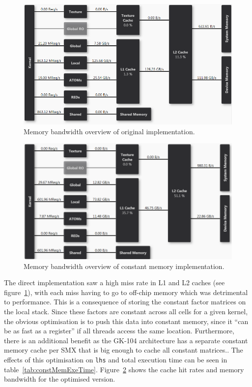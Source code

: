\documentclass[11pt, oneside, a4paper]{article}
\begin{document}
\begin{figure}[tb]
	\begin{center}
		\includegraphics[width=\textwidth]{"Original nonconst LHS memory overview BW"}
	\end{center}
	\caption{Memory bandwidth overview of original implementation.}
	\label{fig:membBWorig}
\end{figure}

\begin{figure}[tb]
	\begin{center}
		\includegraphics[width=\textwidth]{"LHS memory overview BW"}
	\end{center}
	\caption{Memory bandwidth overview of constant memory implementation.}
	\label{fig:membBWfinal}
\end{figure}

The direct implementation saw a high miss rate in L1 and L2 caches (see figure~\ref{fig:membBWorig}), with each miss having to go to off-chip memory which was detrimental to performance. This is a consequence of storing the constant factor matrices on the local stack. Since these factors are constant across all cells for a given kernel, the obvious optimisation is to push this data into constant memory, since it ``can be as fast as a register''\cite{Best Practices} if all threads access the same location. Furthermore, there is an additional benefit as the GK-104 architecture has a separate constant memory cache per SMX that is big enough to cache all constant matrices.. The effects of this optimisation on \texttt{lhs} and total execution time can be seen in table~\ref{tab:constMemExeTime}. Figure~\ref{fig:membBWfinal} shows the cache hit rates and memory bandwidth for the optimised version.
\end{document}
